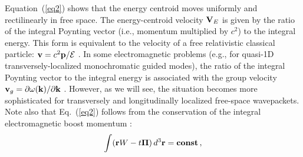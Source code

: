 \documentclass[12pt, a4paper, superscriptaddress, final]{iopart}
\begin{document}
Equation~(\ref{eq2}) shows that the energy centroid moves uniformly and rectilinearly in free space. 
The energy-centroid velocity ${\bf V}_E$ is given by the ratio of the integral Poynting vector (i.e., momentum multiplied by $c^2$) to the integral energy. This form is equivalent to the velocity of a free relativistic classical particle: ${\bf v} = c^2 {\bf p}/{\cal E}$ \cite{LLfield}. In some electromagnetic problems (e.g., for quasi-1D transversely-localized monochromatic guided modes), the ratio of the integral Poynting vector to the integral energy is associated with the group velocity ${\bf v}_g = \partial \omega ({\bf k}) / \partial {\bf k}$ \cite{Snyder, Nkoma1974, Bliokh2017PRL, Picardi2018}. However, as we will see, the situation becomes more sophisticated for transversely and longitudinally localized free-space wavepackets. Note also that Eq.~(\ref{eq2}) follows from the conservation of the integral electromagnetic boost momentum \cite{LLfield, Bliokh2013NJP, Smirnova2018}:  
%
\begin{equation}
\label{eq4}
 \int ({\bf r} W - t {\bm \Pi}) \,d^3{\bf r} = {\bf const}\,, 
 \end{equation}
%
\end{document}
